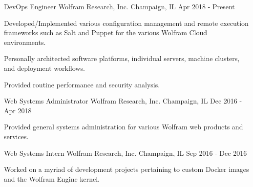

\begin{cventries}

  \cventry
    {DevOps Engineer} %
    {Wolfram Research, Inc.} %
    {Champaign, IL} %
    {Apr 2018 - Present} %
    {
      \begin{cvitems} %
        \item {Developed/Implemented various configuration management and remote execution frameworks such as Salt and Puppet for the various Wolfram Cloud environments.}
        \item {Personally architected software platforms, individual servers, machine clusters, and deployment workflows.}
        \item {Provided routine performance and security analysis.}
      \end{cvitems}
    }

  \cventry
    {Web Systems Administrator} %
    {Wolfram Research, Inc.} %
    {Champaign, IL} %
    {Dec 2016 - Apr 2018} %
    {
      \begin{cvitems} %
        \item {Provided general systems administration for various Wolfram web products and services.}
      \end{cvitems}
    }

  \cventry
    {Web Systems Intern} %
    {Wolfram Research, Inc.} %
    {Champaign, IL} %
    {Sep 2016 - Dec 2016} %
    {
      \begin{cvitems} %
        \item {Worked on a myriad of development projects pertaining to custom Docker images and the Wolfram Engine kernel.}
      \end{cvitems}
    }


\end{cventries}
